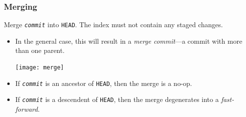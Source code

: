 \documentclass{beamer}
\begin{document}
\begin{frame}
  \frametitle{Merging}
  \begin{description}
  \item[\texttt{git merge \textit{commit}}] Merge
    \texttt{\textit{commit}} into \texttt{HEAD}. The index must not
    contain any staged changes.
  \end{description}

  \begin{itemize}
  \item In the general case, this will result in a \emph{merge
      commit}---a commit with more than one parent.
    \begin{center}
      \texttt{[image: merge]}
    \end{center}
  \item If \texttt{\textit{commit}} is an ancestor of \texttt{HEAD},
    then the merge is a no-op.
  \item If \texttt{\textit{commit}} is a descendent of \texttt{HEAD},
    then the merge degenerates into a \emph{fast-forward}.
  \end{itemize}
\end{frame}
\end{document}
